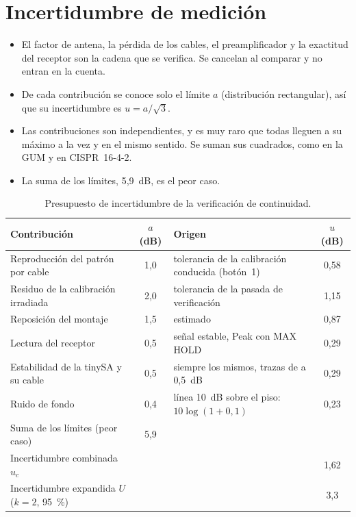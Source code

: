 \documentclass[11pt,a4paper]{article}
\begin{document}
\newpage
\section{Incertidumbre de medición}\label{sec:incertidumbre}

\begin{itemize}
  \item El factor de antena, la pérdida de los cables, el preamplificador y la exactitud del receptor son la cadena que se verifica. Se cancelan al comparar y no entran en la cuenta.
  \item De cada contribución se conoce solo el límite $a$ (distribución rectangular), así que su incertidumbre es $u = a/\sqrt{3}$.
  \item Las contribuciones son independientes, y es muy raro que todas lleguen a su máximo a la vez y en el mismo sentido. Se suman sus cuadrados, como en la GUM y en CISPR~16-4-2.
  \item La suma de los límites, 5,9~dB, es el peor caso.
\end{itemize}

\begin{table}[H]
  \centering
  \begin{tabular}{@{}lcp{5.6cm}c@{}}
    \toprule
    Contribución & $a$ (dB) & Origen & $u$ (dB) \\
    \midrule
    Reproducción del patrón por cable    & 1,0 & tolerancia de la calibración conducida (botón~1) & 0,58 \\
    Residuo de la calibración irradiada  & 2,0 & tolerancia de la pasada de verificación & 1,15 \\
    Reposición del montaje               & 1,5 & estimado & 0,87 \\
    Lectura del receptor                 & 0,5 & señal estable, Peak con MAX HOLD & 0,29 \\
    Estabilidad de la tinySA y su cable  & 0,5 & siempre los mismos, trazas de a 0,5~dB & 0,29 \\
    Ruido de fondo                       & 0,4 & línea 10~dB sobre el piso: $10\log(1+0{,}1)$ & 0,23 \\
    \midrule
    Suma de los límites (peor caso)      & 5,9 & & \\
    Incertidumbre combinada $u_c$        &     & & 1,62 \\
    Incertidumbre expandida $U$ ($k=2$, 95~\%) & & & 3,3 \\
    \bottomrule
  \end{tabular}
  \caption{Presupuesto de incertidumbre de la verificación de continuidad.}
  \label{tab:incertidumbre}
\end{table}
\end{document}
